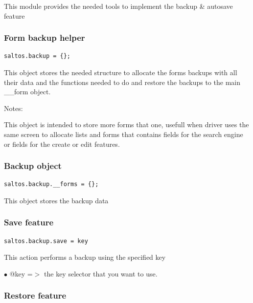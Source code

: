 \documentclass[a4paper]{article}
\begin{document}
This module provides the needed tools to implement the backup \& autosave feature

\hypertarget{toc30}{}
\subsubsection{Form backup helper}

\begin{lstlisting}
saltos.backup = {};
\end{lstlisting}

This object stores the needed structure to allocate the forms backups with all their
data and the functions needed to do and restore the backups to the main \_\_form object.

Notes:

This object is intended to store more forms that one, usefull when driver uses the same
screen to allocate lists and forms that contains fields for the search engine or fields
for the create or edit features.

\hypertarget{toc31}{}
\subsubsection{Backup object}

\begin{lstlisting}
saltos.backup.__forms = {};
\end{lstlisting}

This object stores the backup data

\hypertarget{toc32}{}
\subsubsection{Save feature}

\begin{lstlisting}
saltos.backup.save = key
\end{lstlisting}

This action performs a backup using the specified key

\begin{compactitem}
\item[\color{myblue}$\bullet$] @key =$>$ the key selector that you want to use.
\end{compactitem}

\hypertarget{toc33}{}
\subsubsection{Restore feature}
\end{document}
